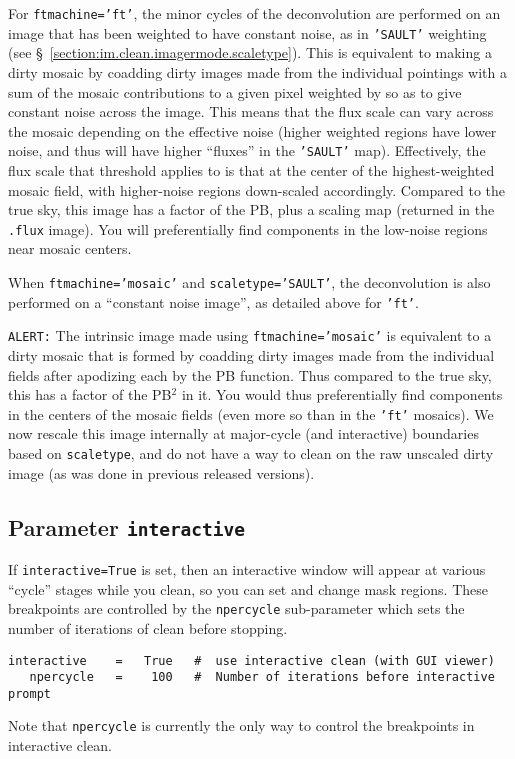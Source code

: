 For {\tt ftmachine='ft'}, the minor cycles of the deconvolution are
performed on an image that has been weighted to have constant noise,
as in {\tt 'SAULT'} weighting (see
\S~\ref{section:im.clean.imagermode.scaletype}).  This is equivalent to making
a dirty mosaic by coadding dirty images made from the individual 
pointings with a sum of the mosaic contributions to a given pixel
weighted by so as to give constant noise across the image.
This means that the flux scale can vary across the mosaic depending
on the effective noise (higher weighted regions have lower noise, and
thus will have higher ``fluxes'' in the {\tt 'SAULT'} map).  Effectively,
the flux scale that threshold applies to is that at the center of the
highest-weighted mosaic field, with higher-noise regions down-scaled
accordingly.  Compared to the true sky, this image has a factor of
the PB, plus a scaling map (returned in the {\tt .flux} image).
You will preferentially find components in the low-noise
regions near mosaic centers.

When {\tt ftmachine='mosaic'} and {\tt scaletype='SAULT'}, the
deconvolution is also performed on a ``constant noise image'',
as detailed above for {\tt 'ft'}. 

{\tt ALERT:} The intrinsic image made using {\tt ftmachine='mosaic'} is equivalent
to a dirty mosaic that is formed by coadding dirty images made from
the individual fields after apodizing each by the PB function.  Thus
compared to the true sky, this has a factor of the PB$^2$ in it.  You
would thus preferentially find components in the centers of the mosaic
fields (even more so than in the {\tt 'ft'} mosaics).  We now rescale
this image internally at major-cycle (and interactive) boundaries
based on {\tt scaletype}, and do not have a way to clean on the raw
unscaled dirty image (as was done in previous released versions).

\subsection{Parameter {\tt interactive} }
\label{section:im.clean.interactive}

If {\tt interactive=True} is set, then an interactive window
will appear at various ``cycle'' stages while you clean, so you
can set and change mask regions.  These breakpoints are controlled
by the {\tt npercycle} sub-parameter which sets the number of
iterations of clean before stopping.
\small
\begin{verbatim}
interactive    =   True   #  use interactive clean (with GUI viewer)
   npercycle   =    100   #  Number of iterations before interactive prompt
\end{verbatim}
\normalsize
Note that {\tt npercycle} is currently the only way to control the
breakpoints in interactive clean. 

